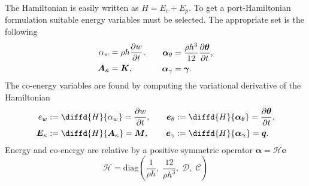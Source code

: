 \documentclass{ifacconf}
\begin{document}
The Hamiltonian  is easily written as $H = E_c + E_p$. To get a port-Hamiltonian formulation suitable energy variables must be selected. The appropriate set is the following
\begin{equation}
\begin{aligned}
\alpha_w &= \rho h \diffp{w}{t}, \\
\bm{A}_{\kappa} &= \bm{K}, \\
\end{aligned} \qquad
\begin{aligned}
\bm\alpha_{\theta} &= \frac{\rho h^3}{12} \diffp{\bm{\theta}}{t}, \\
\bm\alpha_{\gamma} &= \bm{\gamma}. \\
\end{aligned}
\end{equation}
The co-energy variables are found by computing the variational derivative of the Hamiltonian
\begin{equation}
\begin{aligned}
e_w &:= \diffd{H}{\alpha_w} = \diffp{w}{t},  \\
\bm{E}_{\kappa} &:= \diffd{H}{\bm{A}_{\kappa}} = \bm{M}, \\
\end{aligned} \qquad
\begin{aligned}
\bm{e}_{\theta} &:= \diffd{H}{\bm\alpha_{\theta}} = \diffp{\bm{\theta}}{t}, \\
\bm{e}_{\gamma} &:= \diffd{H}{\bm{\alpha}_{\bm{\gamma}}} = \bm{q}. \\
\end{aligned}
\end{equation}
Energy and co-energy are relative by a positive symmetric operator $\bm{\alpha} = \mathcal{H} \bm{e}$
\begin{equation}
\mathcal{H} = \mathrm{diag}(\frac{1}{\rho h}, \; \frac{12}{\rho h^3} , \; \mathcal{D}, \; \mathcal{C})
\end{equation}
\end{document}
